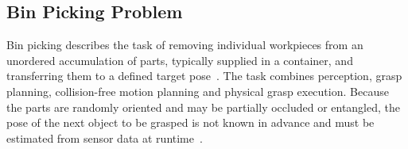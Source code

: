 

\subsection{Bin Picking Problem}
\label{subsubsec:bin_picking}

Bin picking describes the task of removing individual workpieces from an unordered accumulation of parts, typically supplied in a container, and
transferring them to a defined target pose~\cite{Khalid2021Automatic,Kyprianou2023Bin-Picking}. The task combines perception, grasp planning,
collision-free motion planning and physical grasp execution. Because the parts are randomly oriented and may be partially occluded or entangled, the
pose of the next object to be grasped is not known in advance and must be estimated from sensor data at runtime~\cite{Zhang2021A,Tipary2021Planning}.

